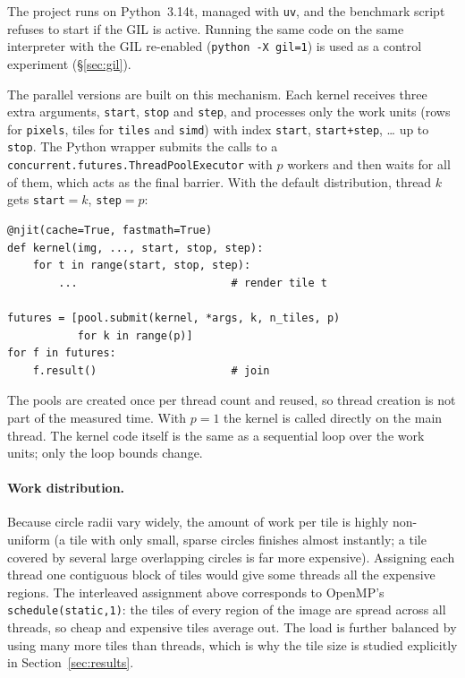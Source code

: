 \documentclass[10pt,twocolumn,letterpaper]{article}
\begin{document}
The project runs on Python~3.14t, managed with \texttt{uv}, and the
benchmark script refuses to start if the GIL is active. Running the same
code on the same interpreter with the GIL re-enabled
(\texttt{python -X gil=1}) is used as a control experiment
(\S\ref{sec:gil}).

The parallel versions are built on this mechanism. Each kernel
receives three extra arguments, \texttt{start}, \texttt{stop} and
\texttt{step}, and processes only the work units (rows for \texttt{pixels},
tiles for \texttt{tiles} and \texttt{simd}) with index \texttt{start},
\texttt{start+step}, \dots{} up to \texttt{stop}. The Python wrapper
submits the calls to a \texttt{concurrent.futures.ThreadPoolExecutor} with
$p$ workers and then waits for all of them, which acts as the final barrier.
With the default distribution, thread $k$ gets \texttt{start}$=k$,
\texttt{step}$=p$:

\begin{lstlisting}
@njit(cache=True, fastmath=True)
def kernel(img, ..., start, stop, step):
    for t in range(start, stop, step):
        ...                        # render tile t

futures = [pool.submit(kernel, *args, k, n_tiles, p)
           for k in range(p)]
for f in futures:
    f.result()                     # join
\end{lstlisting}

The pools are created once per thread count and reused, so thread creation
is not part of the measured time. With $p=1$ the kernel is called directly
on the main thread. The kernel code itself is the same as a sequential loop
over the work units; only the loop bounds change.

\paragraph{Work distribution.} Because circle radii vary widely, the amount
of work per tile is highly non-uniform (a tile with only small, sparse
circles finishes almost instantly; a tile covered by several large
overlapping circles is far more expensive). Assigning each thread one
contiguous block of tiles would give some threads all the expensive regions.
The interleaved assignment above corresponds to OpenMP's
\texttt{schedule(static,1)}: the tiles of every region of the image are
spread across all threads, so cheap and expensive tiles average out. The
load is further balanced by using many more tiles than threads, which is why
the tile size is studied explicitly in Section~\ref{sec:results}.
\end{document}
